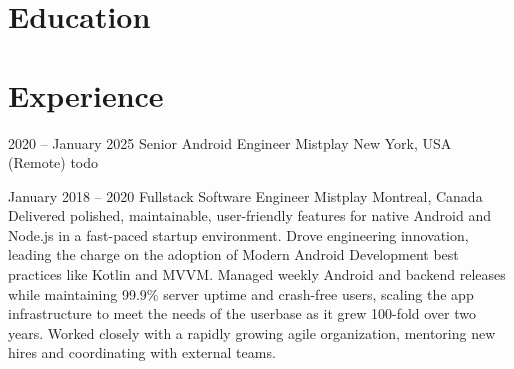 \documentclass[10pt,a4paper,sans]{moderncv} %
\newcommand{\vs}[0]{\smallskip}
\begin{document}
\makecvtitle %
\vspace{-1cm}


\section{Education}

\vs
{}



\section{Experience}


\cventry
{2020 -- January 2025}
{Senior Android Engineer}
{{Mistplay}}
{New York, USA (Remote)}
{}{
	todo
}\vs

\cventry
{January 2018 -- 2020}
{Fullstack Software Engineer}
{{Mistplay}}
{Montreal, Canada}
{}
{
	Delivered polished, maintainable, user-friendly features for native Android and Node.js in a fast-paced startup environment. Drove engineering innovation, leading the charge on the adoption of Modern Android Development best practices like Kotlin and MVVM. Managed weekly Android and backend releases while maintaining 99.9\% server uptime and crash-free users, scaling the app infrastructure to meet the needs of the userbase as it grew 100-fold over two years. Worked closely with a rapidly growing agile organization, mentoring new hires and coordinating with external teams.
}\vs
\end{document}
